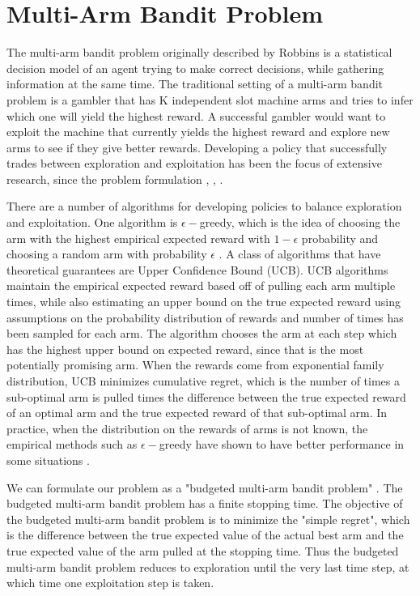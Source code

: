 \documentclass[letterpaper, 10 pt, conference]{ieeeconf}  %
\begin{document}
\section{Multi-Arm Bandit Problem}
The multi-arm bandit problem originally described by Robbins \cite{robbins1985some} is a statistical decision model of an agent trying to make correct decisions, while gathering information at the same time.
The traditional setting of a multi-arm bandit problem is a gambler that has K independent slot machine arms and tries to infer which one will yield the highest reward.
A successful gambler would want to exploit the machine that currently yields the highest reward and explore new arms to see if they give better rewards.
Developing a policy that successfully trades between exploration and exploitation has been the focus of extensive research, since the problem formulation \cite{bubeck2009pure}, \cite{robbins1985some}, \cite{bergemann2006bandit}. 

There are a number of algorithms for developing policies to balance exploration and exploitation.
One algorithm is $\epsilon-$greedy, which is the idea of choosing the arm with the highest empirical expected reward with $1-\epsilon$ probability and choosing a random arm with probability $\epsilon$ \cite{barto1998reinforcement}.
A class of algorithms that have theoretical guarantees are Upper Confidence Bound (UCB).
UCB algorithms maintain the empirical expected reward based off of pulling each arm multiple times, while also estimating an upper bound on the true expected reward using assumptions on the probability distribution of rewards and number of times has been sampled for each arm.
The algorithm chooses the arm at each step which has the highest upper bound on expected reward, since that is the most potentially promising arm.
When the rewards come from exponential family distribution, UCB minimizes cumulative regret, which is the number of times a sub-optimal arm is pulled times the difference between the true expected reward of an optimal arm and the true expected reward of that sub-optimal arm.
In practice, when the distribution on the rewards of arms is not known, the empirical methods such as $\epsilon-$greedy have shown to have better performance in some situations \cite{kuleshov}.

We can formulate our problem as a "budgeted multi-arm bandit problem" \cite{madani2004budgeted}.
The budgeted multi-arm bandit problem has a finite stopping time.
The objective of the budgeted multi-arm bandit problem is to minimize the "simple regret", which is the difference between the true expected value of the actual best arm and the true expected value of the arm pulled at the stopping time.
Thus the budgeted multi-arm bandit problem reduces to exploration until the very last time step, at which time one exploitation step is taken.
\end{document}
